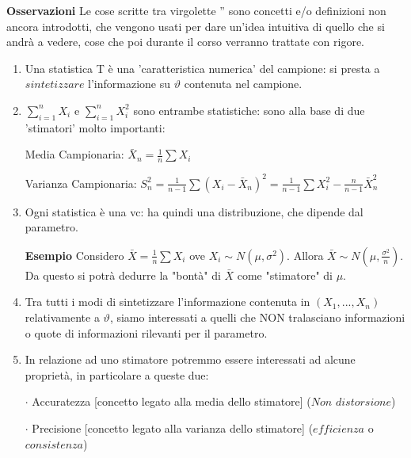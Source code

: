 \textbf{Osservazioni}
Le cose scritte tra virgolette '' sono concetti e/o definizioni non ancora introdotti, che vengono usati per dare un'idea intuitiva di quello che si andrà a vedere, cose che poi durante il corso verranno trattate con rigore.
\begin{enumerate}
\item Una statistica T è una 'caratteristica numerica' del campione: si presta a $sintetizzare$ l'informazione su $\vartheta$ contenuta nel campione.
\item $\sum_{i=1}^n X_i$ e $\sum_{i=1}^n X_i^2$ sono entrambe statistiche: sono alla base di due 'stimatori' molto importanti:

Media Campionaria: $\bar{X}_n =\frac{1}{n}\sum X_i$

Varianza Campionaria: $S_n^2=\frac{1}{n-1} \sum (X_i-\bar{X}_n)^2 = \frac{1}{n-1} \sum X_i^2 - \frac{n}{n-1}\bar{X}_n^2$
\item Ogni statistica è una vc: ha quindi una distribuzione, che dipende dal parametro.

\textbf{Esempio} Considero $\bar{X}=\frac{1}{n} \sum X_i$ ove $X_i \sim N(\mu,\sigma^2)$. Allora $\bar{X} \sim N(\mu,\frac{\sigma^2}{n})$. Da questo si potrà dedurre la "bontà" di $\bar{X}$ come "stimatore" di $\mu$.
\item Tra tutti i modi di sintetizzare l'informazione contenuta in $(X_1,...,X_n)$ relativamente a $\vartheta$, siamo interessati a quelli che NON tralasciano informazioni o quote di informazioni rilevanti per il parametro.
\item In relazione ad uno stimatore potremmo essere interessati ad alcune proprietà, in particolare a queste due:

$\cdot$ Accuratezza [concetto legato alla media dello stimatore] ($Non$ $distorsione$)

$\cdot$ Precisione [concetto legato alla varianza dello stimatore] ($efficienza$ o $consistenza$)
\end{enumerate}
